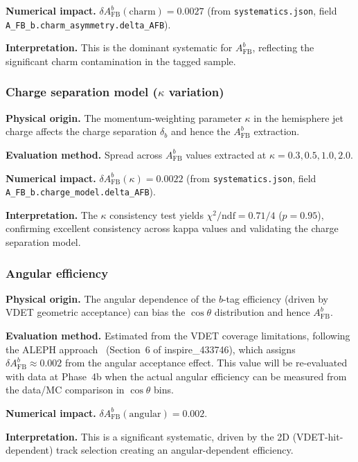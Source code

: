 \documentclass[11pt,a4paper]{article}
\begin{document}
\textbf{Numerical impact.}
$\delta A_\mathrm{FB}^b(\mathrm{charm}) = 0.0027$
(from \texttt{systematics.json}, field \texttt{A\_FB\_b.charm\_asymmetry.delta\_AFB}).

\textbf{Interpretation.} This is the dominant systematic for $A_\mathrm{FB}^b$,
reflecting the significant charm contamination in the tagged sample.

\subsubsection{Charge separation model ($\kappa$ variation)}
\label{sec:syst_kappa}

\textbf{Physical origin.} The momentum-weighting parameter $\kappa$ in the hemisphere
jet charge affects the charge separation $\delta_b$ and hence the $A_\mathrm{FB}^b$ extraction.

\textbf{Evaluation method.} Spread across $A_\mathrm{FB}^b$ values extracted at
$\kappa = 0.3, 0.5, 1.0, 2.0$.

\textbf{Numerical impact.}
$\delta A_\mathrm{FB}^b(\kappa) = 0.0022$
(from \texttt{systematics.json}, field \texttt{A\_FB\_b.charge\_model.delta\_AFB}).

\textbf{Interpretation.} The $\kappa$ consistency test yields $\chi^2/\mathrm{ndf} = 0.71/4$
($p = 0.95$), confirming excellent consistency across kappa values and validating the
charge separation model.

\subsubsection{Angular efficiency}
\label{sec:syst_angular}

\textbf{Physical origin.} The angular dependence of the $b$-tag efficiency (driven by
VDET geometric acceptance) can bias the $\cos\theta$ distribution and hence $A_\mathrm{FB}^b$.

\textbf{Evaluation method.} Estimated from the VDET coverage limitations, following the
ALEPH approach~\cite{ALEPH:Rb:1996} (Section~6 of inspire\_433746), which assigns
$\delta A_\mathrm{FB}^b \approx 0.002$ from the angular acceptance effect. This value
will be re-evaluated with data at Phase~4b when the actual angular efficiency can be
measured from the data/MC comparison in $\cos\theta$ bins.

\textbf{Numerical impact.}
$\delta A_\mathrm{FB}^b(\mathrm{angular}) = 0.002$.

\textbf{Interpretation.} This is a significant systematic, driven by the 2D (VDET-hit-dependent)
track selection creating an angular-dependent efficiency.
\end{document}
